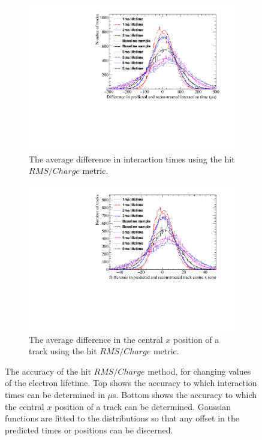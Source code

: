 \begin{figure}
  \centering
  \begin{subfigure}{0.6\textwidth}
    \centering
    \includegraphics[width=\textwidth]{Canvas_AvDiff_T_RMS_Q_ElecLifetime}
    \caption{The average difference in interaction times using the hit $RMS/Charge$ metric.}
    \label{fig:DiffLifeStudy_AvDiff_RMS_Int_T}
  \end{subfigure}
  \begin{subfigure}{0.6\textwidth}
    \centering
    \includegraphics[width=\textwidth]{Canvas_AvDiff_X_RMS_Q_ElecLifetime}
    \caption{The average difference in the central $x$ position of a track using the hit $RMS/Charge$ metric.}
    \label{fig:DiffLifeStudy_AvDiff_RMS_Int_X}
  \end{subfigure}
  \caption[Comparing the accuracy of the hit $RMS$ method, as the electron lifetime changes]
          {The accuracy of the hit $RMS/Charge$ method, for changing values of the electron lifetime. Top shows the accuracy to which interaction times can be determined in $\mu$s. Bottom shows the accuracy to which the central $x$ position of a track can be determined. Gaussian functions are fitted to the distributions so that any offset in the predicted times or positions can be discerned.}
  \label{fig:DiffLifeStudy_AvDiff_RMS_Int}
\end{figure}

